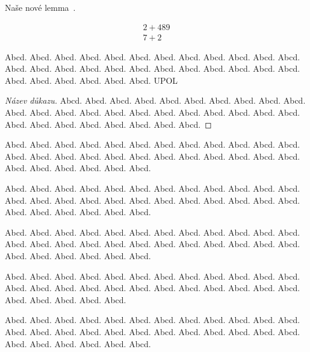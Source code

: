 \documentclass[
  master=false,               %
  font=sans,                  %
  printversion=false,         %
  joinlists=true,             %
  glossaries=true,            %
  figures=true,               %
  tables=true,                %
  sourcecodes=true,					  %
  theorems=true,						  %
  bibencoding=utf8,           %
  language=czech,             %
  encoding=utf8,              %
  field=inf,                  %
  index=true,                 %
]{updiplom}
\begin{document}
\begin{lemma}
Naše nové lemma~\cite{kniha2}.
\end{lemma}

\begin{align}
2+489 \\
7+2
\end{align}


\begin{definition}
Abcd. Abcd. Abcd. Abcd. Abcd. Abcd. Abcd. Abcd. Abcd. Abcd. Abcd. Abcd. Abcd. Abcd. Abcd. Abcd. Abcd. Abcd. Abcd. Abcd. Abcd. Abcd. Abcd. Abcd. Abcd. Abcd. Abcd. Abcd. Abcd. Abcd. \gls{UPOL}
\end{definition}

\begin{proof}[Název důkazu]
Abcd. Abcd. Abcd. Abcd. Abcd. Abcd. Abcd. Abcd. Abcd. Abcd. Abcd. Abcd. Abcd. Abcd. Abcd. Abcd. Abcd. Abcd. Abcd. Abcd. Abcd. Abcd. Abcd. Abcd. Abcd. Abcd. Abcd. Abcd. Abcd. Abcd. 
\end{proof}

\begin{remark}
Abcd. Abcd. Abcd. Abcd. Abcd. Abcd. Abcd. Abcd. Abcd. Abcd. Abcd. Abcd. Abcd. Abcd. Abcd. Abcd. Abcd. Abcd. Abcd. Abcd. Abcd. Abcd. Abcd. Abcd. Abcd. Abcd. Abcd. Abcd. Abcd. Abcd. 
\end{remark}

\begin{example}
Abcd. Abcd. Abcd. Abcd. Abcd. Abcd. Abcd. Abcd. Abcd. Abcd. Abcd. Abcd. Abcd. Abcd. Abcd. Abcd. Abcd. Abcd. Abcd. Abcd. Abcd. Abcd. Abcd. Abcd. Abcd. Abcd. Abcd. Abcd. Abcd. Abcd. 
\end{example}

\begin{lemma}
Abcd. Abcd. Abcd. Abcd. Abcd. Abcd. Abcd. Abcd. Abcd. Abcd. Abcd. Abcd. Abcd. Abcd. Abcd. Abcd. Abcd. Abcd. Abcd. Abcd. Abcd. Abcd. Abcd. Abcd. Abcd. Abcd. Abcd. Abcd. Abcd. Abcd. 
\end{lemma}

\begin{consequence}
Abcd. Abcd. Abcd. Abcd. Abcd. Abcd. Abcd. Abcd. Abcd. Abcd. Abcd. Abcd. Abcd. Abcd. Abcd. Abcd. Abcd. Abcd. Abcd. Abcd. Abcd. Abcd. Abcd. Abcd. Abcd. Abcd. Abcd. Abcd. Abcd. 
\end{consequence}

\begin{theorem}
Abcd. Abcd. Abcd. Abcd. Abcd. Abcd. Abcd. Abcd. Abcd. Abcd. Abcd. Abcd. Abcd. Abcd. Abcd. Abcd. Abcd. Abcd. Abcd. Abcd. Abcd. Abcd. Abcd. Abcd. Abcd. Abcd. Abcd. Abcd. Abcd. Abcd. 
\end{theorem}
\end{document}
